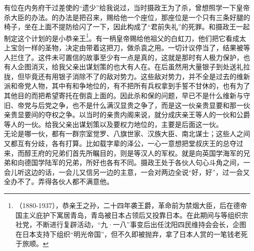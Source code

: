 有位在内务府干过差使的“遗少”给我说过，当时摄政王为了杀，曾想照学一下皇帝杀大臣的办法。的办法是把召来，赐给他一个座位，那座位是一个只有三条好腿的椅子，坐在上面不提防给闪了一下，因此构成了“君前失礼”的死罪。和摄政王一起制定这个计划的是小恭亲王\footnote{（1880-1937），恭亲王之孙，二十四年袭王爵，革命前为禁烟大臣，后在德帝国主义庇护下寓居青岛，青岛被日本占领后又投靠日本。在此期间与等组织宗社党，不断进行复辟活动，“九·一八”事变后出任沈阳四民维持会会长，企图在日本支持下组织“明光帝国”，但不久即被抛弃，拿了日本人赏的一笔钱老死于旅顺。}。有一柄皇帝赐给他祖父的白虹刀，他们把它看成太上宝剑一样的圣物，决定由带着这把刀，做杀袁之用。一切计议停当了，结果被等人拦住了。这件未可置信的故事至少有一点是真的，这就是那时有人极力保护，也有人企图消灭，给我父亲出谋划策的也大有人在。在后虽然用大量银子到处送礼拉拢，但毕竟还有用银子消除不了的敌对势力。这些敌对势力，并不全是过去的维新派和帝党人物，其中有和争地位的，有不把所有兵权拿到手誓不甘休的，也有为了其他目的而把希望寄托在倒袁上面的。因此杀和保的问题，早已不是什么维新与守旧、帝党与后党之争，也不是什么满汉显贵之争了，而是这一伙亲贵显要和那一伙亲贵显要间的夺权之争。以当时的亲贵内阁来说，就分成庆亲王等人的一伙和公爵等人的一伙。给我父亲出谋划策以及要权力地位的，主要是后面这一伙。\\

无论是哪一伙，都有一群宗室觉罗、八旗世家、汉族大臣、南北谋士；这些人之间又都互有分歧，各有打算。比如载字辈的泽公，一心一意想把堂叔庆王的总夺过来，而醇王府的兄弟们首先所瞩目的，则是等汉人的军权。就是向英国学海军的兄弟和向德国学陆军的兄弟，所好也各有不同。摄政王处于各伙人句心斗角之间，一会儿听这边的话，一会儿又信另一边的主意，一会对两边全说“好，好”，过一会又全办不了。弄得各伙人都不满意他。\\


